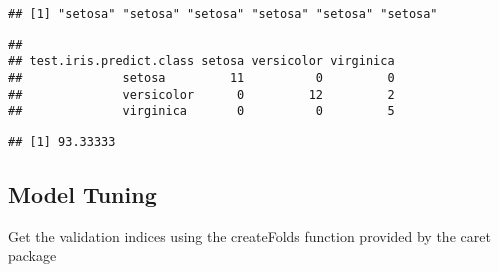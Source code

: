\documentclass[
]{book}
\newenvironment{Shaded}{\begin{snugshade}}{\end{snugshade}}
\newcommand{\DecValTok}[1]{\textcolor[rgb]{0.00,0.00,0.81}{#1}}
\newcommand{\KeywordTok}[1]{\textcolor[rgb]{0.13,0.29,0.53}{\textbf{#1}}}
\newcommand{\NormalTok}[1]{#1}
\newcommand{\OperatorTok}[1]{\textcolor[rgb]{0.81,0.36,0.00}{\textbf{#1}}}
\newcommand{\StringTok}[1]{\textcolor[rgb]{0.31,0.60,0.02}{#1}}
\begin{document}
\begin{verbatim}
## [1] "setosa" "setosa" "setosa" "setosa" "setosa" "setosa"
\end{verbatim}

\begin{Shaded}
\end{Shaded}

\begin{verbatim}
##                        
## test.iris.predict.class setosa versicolor virginica
##              setosa         11          0         0
##              versicolor      0         12         2
##              virginica       0          0         5
\end{verbatim}

\begin{Shaded}
\end{Shaded}

\begin{verbatim}
## [1] 93.33333
\end{verbatim}

\hypertarget{model-tuning-1}{%
\subsection{Model Tuning}\label{model-tuning-1}}

Get the validation indices using the createFolds function provided by the caret package
\end{document}
